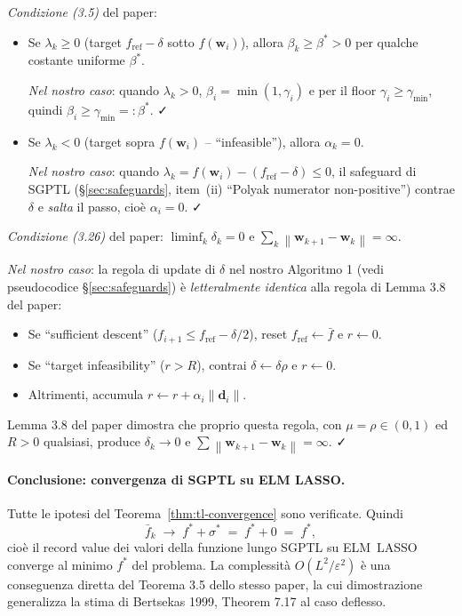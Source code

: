 \documentclass[11pt,a4paper]{article}
\newcommand{\norm}[1]{\left\|#1\right\|}
\newcommand{\bw}{\mathbf{w}}
\newcommand{\bd}{\mathbf{d}}
\theoremstyle{definition}
\begin{document}
\emph{Condizione (3.5)} del paper:
\begin{itemize}[leftmargin=*]
\item Se $\lambda_k \ge 0$ (target $f_{\mathrm{ref}}-\delta$ sotto $f(\bw_i)$), allora $\beta_k \ge \beta^* > 0$ per qualche costante uniforme $\beta^*$.

\emph{Nel nostro caso}: quando $\lambda_k > 0$, $\beta_i = \min(1,\gamma_i)$ e per il floor $\gamma_i \ge \gamma_{\min}$, quindi $\beta_i \ge \gamma_{\min} =: \beta^*$. ✓

\item Se $\lambda_k < 0$ (target sopra $f(\bw_i)$ -- ``infeasible''), allora $\alpha_k = 0$.

\emph{Nel nostro caso}: quando $\lambda_k = f(\bw_i) - (f_{\mathrm{ref}}-\delta) \le 0$, il safeguard di SGPTL (§\ref{sec:safeguards}, item~(ii) ``Polyak numerator non-positive'') contrae $\delta$ e \emph{salta} il passo, cioè $\alpha_i = 0$. ✓
\end{itemize}

\emph{Condizione (3.26)} del paper: $\liminf_k \delta_k = 0$ e $\sum_k \norm{\bw_{k+1}-\bw_k} = \infty$.

\emph{Nel nostro caso}: la regola di update di $\delta$ nel nostro Algoritmo 1 (vedi pseudocodice §\ref{sec:safeguards}) è \emph{letteralmente identica} alla regola di Lemma 3.8 del paper:
\begin{itemize}[leftmargin=*,nosep]
\item Se ``sufficient descent'' ($f_{i+1}\le f_{\mathrm{ref}}-\delta/2$), reset $f_{\mathrm{ref}}\gets \bar f$ e $r \gets 0$.
\item Se ``target infeasibility'' ($r > R$), contrai $\delta\gets\delta\rho$ e $r\gets 0$.
\item Altrimenti, accumula $r\gets r + \alpha_i\norm{\bd_i}$.
\end{itemize}
Lemma 3.8 del paper dimostra che proprio questa regola, con $\mu = \rho \in (0,1)$ ed $R>0$ qualsiasi, produce $\delta_k \to 0$ e $\sum \norm{\bw_{k+1}-\bw_k} = \infty$. ✓

\paragraph{Conclusione: convergenza di SGPTL su ELM LASSO.}
Tutte le ipotesi del Teorema~\ref{thm:tl-convergence} sono verificate. Quindi
\[
\bar f_k \;\to\; f^* + \sigma^* \;=\; f^* + 0 \;=\; f^*,
\]
cioè il record value dei valori della funzione lungo SGPTL su ELM~LASSO converge al minimo $f^*$ del problema. La complessità $O(L^2/\varepsilon^2)$ è una conseguenza diretta del Teorema 3.5 dello stesso paper, la cui dimostrazione generalizza la stima di Bertsekas 1999, Theorem 7.17 al caso deflesso.
\end{document}
